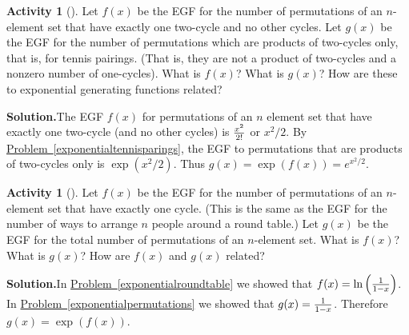 \documentclass[10pt,]{book}
\theoremstyle{plain}
\theoremstyle{definition}
\newtheorem{activity}[project]{Activity}
\numberwithin{equation}{chapter}
\begin{document}
\begin{activity}[]\label{exp_two-cycle_}
Let \(f(x)\) be the EGF for the number of permutations of an \(n\)-element set that have exactly one two-cycle and no other cycles. Let \(g(x)\) be the EGF for the number of permutations which are products of two-cycles only, that is, for tennis pairings. (That is, they are not a product of two-cycles and a nonzero number of one-cycles). What is \(f(x)\)? What is \(g(x)\)? How are these to exponential generating functions related?%
\par\medskip\noindent%
\textbf{Solution.}\quad The EGF \(f(x)\) for permutations of an \(n\) element set that have exactly one two-cycle (and no other cycles) is \(x^2\over 2!\) or \(x^2/2\). By \hyperref[exponentialtennisparings]{Problem~\ref{exponentialtennisparings}}, the EGF to permutations that are products of two-cycles only is \(\exp(x^2/2)\). Thus \(g(x)=\exp(f(x))=e^{x^2/2}\).%
\end{activity}
\begin{activity}[]\label{exp_onecycle_}
Let \(f(x)\) be the EGF for the number of permutations of an \(n\)-element set that have exactly one cycle. (This is the same as the EGF for the number of ways to arrange \(n\) people around a round table.) Let \(g(x)\) be the EGF for the total number of permutations of an \(n\)-element set. What is \(f(x)\)? What is \(g(x)\)? How are \(f(x)\) and \(g(x)\) related?%
\par\medskip\noindent%
\textbf{Solution.}\quad In \hyperref[exponentialroundtable]{Problem~\ref{exponentialroundtable}} we showed that \(f(x) =
\ln\left({1\over 1-x}\right)\). In \hyperref[exponentialpermutations]{Problem~\ref{exponentialpermutations}} we showed that \(g(x)={1\over 1-x}\). Therefore \(g(x)= \exp(f(x))\).%
\end{activity}
\end{document}
